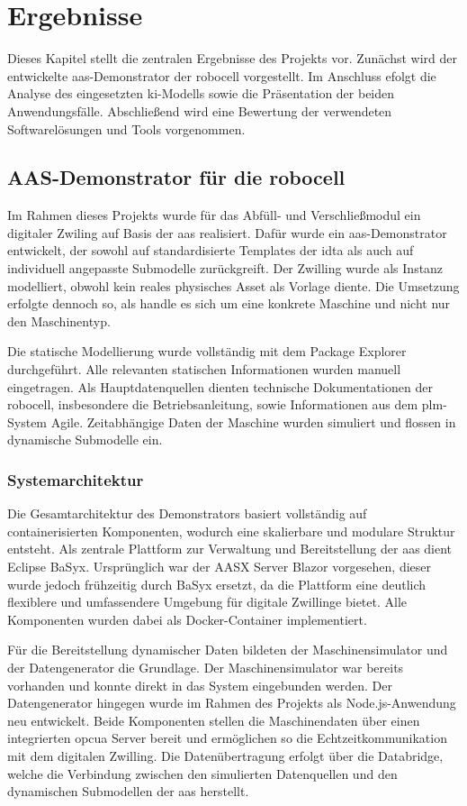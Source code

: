 \newpage
\section{Ergebnisse}
Dieses Kapitel stellt die zentralen Ergebnisse des Projekts vor. 
Zunächst wird der entwickelte \acs{aas}-Demonstrator der robocell vorgestellt.
Im Anschluss efolgt die Analyse des eingesetzten \acs{ki}-Modells sowie die Präsentation der beiden Anwendungsfälle. 
Abschließend wird eine Bewertung der verwendeten Softwarelösungen und Tools vorgenommen.

\subsection{AAS-Demonstrator für die robocell}
Im Rahmen dieses Projekts wurde für das Abfüll- und Verschließmodul ein digitaler Zwiling auf Basis der \acs{aas} realisiert.
Dafür wurde ein \acs{aas}-Demonstrator entwickelt, der sowohl auf standardisierte Templates der \acs{idta} als auch auf individuell angepasste Submodelle zurückgreift. 
Der Zwilling wurde als Instanz modelliert, obwohl kein reales physisches Asset als Vorlage diente. 
Die Umsetzung erfolgte dennoch so, als handle es sich um eine konkrete Maschine und nicht nur den Maschinentyp.

Die statische Modellierung wurde vollständig mit dem Package Explorer durchgeführt. 
Alle relevanten statischen Informationen wurden manuell eingetragen. 
Als Hauptdatenquellen dienten technische Dokumentationen der robocell, insbesondere die Betriebsanleitung, sowie Informationen aus dem \acs{plm}-System Agile.
Zeitabhängige Daten der Maschine wurden simuliert und flossen in dynamische Submodelle ein.

\subsubsection{Systemarchitektur}
Die Gesamtarchitektur des Demonstrators basiert vollständig auf containerisierten Komponenten, wodurch eine skalierbare und modulare Struktur entsteht. 
Als zentrale Plattform zur Verwaltung und Bereitstellung der \acs{aas} dient Eclipse BaSyx. 
Ursprünglich war der AASX Server Blazor vorgesehen, dieser wurde jedoch frühzeitig durch BaSyx ersetzt, da die Plattform eine deutlich flexiblere und umfassendere Umgebung für digitale Zwillinge bietet.
Alle Komponenten wurden dabei als Docker-Container implementiert.

Für die Bereitstellung dynamischer Daten bildeten der Maschinensimulator und der Datengenerator die Grundlage.
Der Maschinensimulator war bereits vorhanden und konnte direkt in das System eingebunden werden. 
Der Datengenerator hingegen wurde im Rahmen des Projekts als Node.js-Anwendung neu entwickelt. 
Beide Komponenten stellen die Maschinendaten über einen integrierten \acs{opcua} Server bereit und ermöglichen so die Echtzeitkommunikation mit dem digitalen Zwilling. 
Die Datenübertragung erfolgt über die Databridge, welche die Verbindung zwischen den simulierten Datenquellen und den dynamischen Submodellen der \acs{aas} herstellt.

